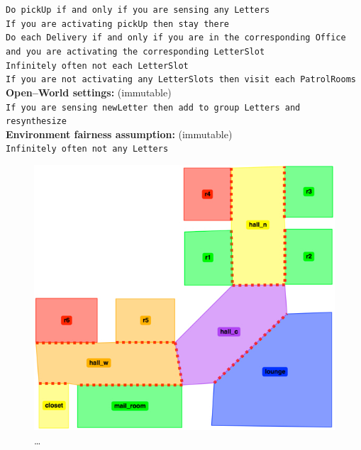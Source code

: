 \begin{algorithm}
{	\texttt{Do pickUp if and only if you are sensing any Letters}\\
	\texttt{If you are activating pickUp then stay there}\\
	
	\texttt{Do each Delivery if and only if you are in the corresponding Office and you are activating the corresponding LetterSlot}\\
	
	\texttt{Infinitely often not each LetterSlot}\\
	\texttt{If you are not activating any LetterSlots then visit each PatrolRooms}\\
	
	\textbf{Open--World settings:} (immutable)\\
	\texttt{If you are sensing newLetter then add to group Letters and resynthesize}\\
		
	\textbf{Environment fairness assumption:} (immutable)\\
	\texttt{Infinitely often not any Letters}\\
	}
	\vspace{-10 pt}
\end{algorithm}

\begin{figure}[h]
	\centering
	\includegraphics[width=0.99\columnwidth, clip]{./img/mailbotMap.jpg}
	\caption{\ldots} %
	\label{Fig:map}
\end{figure}

